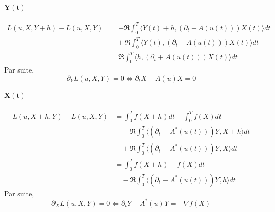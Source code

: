 \paragraph*{$\mathbf{Y(t)}$}
\begin{align*}
L(u,X,Y+h) - L(u,X,Y) &= -\Re \int_{0}^{T}\langle Y (t)+h,(\partial_{t}+A(u(t)))X(t) \rangle dt\\
&\quad +\Re \int_{0}^{T}\langle Y (t),(\partial_{t}+A(u(t)))X(t) \rangle dt\\
&= \Re \int_{0}^{T}\langle h,(\partial_{t}+A(u(t)))X(t) \rangle dt
\end{align*}
Par suite, 
\begin{equation}
\partial_{Y} L(u,X,Y)=0 \iff \partial_{t} X + A(u)X=0
\end{equation}
\paragraph*{$\mathbf{X(t)}$}
\begin{align*}
L(u,X+h,Y) - L(u,X,Y) &= \int_{0}^{T}f(X+h)dt - \int_{0}^{T}f(X)dt\\
&\quad -\Re \int_{0}^{T}\langle (\partial_{t}-A^{*}(u(t)))Y,X+h \rangle dt\\
&\quad +\Re \int_{0}^{T}\langle (\partial_{t}-A^{*}(u(t)))Y,X \rangle dt\\
&= \int_{0}^{T}f(X+h)-f(X)dt\\
&\quad -\Re \int_{0}^{T}\langle (\partial_{t}-A^{*}(u(t)))Y,h \rangle dt
\end{align*}
Par suite, 
\begin{equation}
\partial_{X} L(u,X,Y)=0 \iff \partial_{t} Y - A^{*}(u)Y=- \nabla f(X)
\end{equation}
